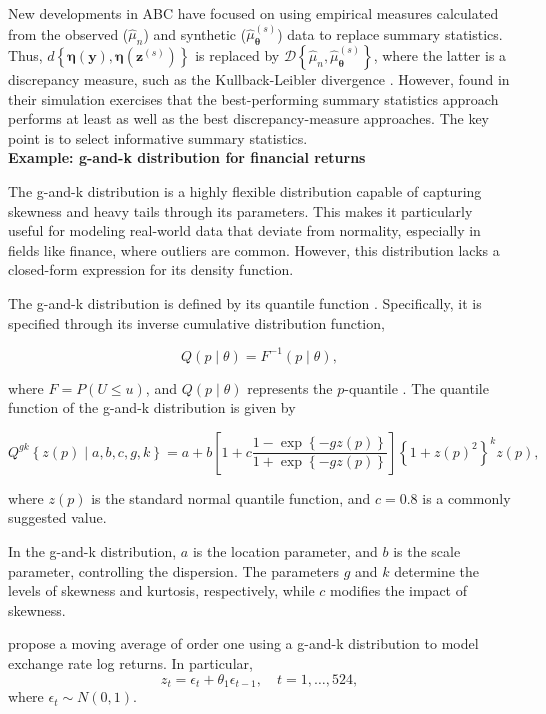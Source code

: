 New developments in ABC have focused on using empirical measures calculated from the observed ($\hat{\mu}_n$) and synthetic ($\hat{\mu}_{\boldsymbol{\theta}}^{(s)}$) data to replace summary statistics. Thus, $d\left\{ \boldsymbol\eta ({\boldsymbol y}),{\boldsymbol \eta }({\boldsymbol z}^{(s)})\right\}$ is replaced by $\mathcal{D}\left\{ \hat{\mu}_n,\hat{\mu}_{\boldsymbol{\theta}}^{(s)}\right\}$, where the latter is a discrepancy measure, such as the Kullback-Leibler divergence \cite{jiang2018approximate}. However, \cite{drovandi2022comparison} found in their simulation exercises that the best-performing summary statistics approach performs at least as well as the best discrepancy-measure approaches. The key point is to select informative summary statistics.\\

\textbf{Example: g-and-k distribution for financial returns} 

The g-and-k distribution is a highly flexible distribution capable of capturing skewness and heavy tails through its parameters. This makes it particularly useful for modeling real-world data that deviate from normality, especially in fields like finance, where outliers are common. However, this distribution lacks a closed-form expression for its density function.

The g-and-k distribution is defined by its quantile function \cite{drovandi2011likelihood}. Specifically, it is specified through its inverse cumulative distribution function,

\[
Q(p\mid{\theta}) = F^{-1}(p\mid{\theta}),
\]

where \( F = P(U \leq u) \), and \( Q (p\mid{\theta}) \) represents the \( p \)-quantile \cite{rayner2002numerical}. The quantile function of the g-and-k distribution is given by

\[
Q^{gk}\left\{z(p)\mid a, b, c, g, k\right\} = a + b\left[1 + c \frac{1 - \exp\left\{-gz(p)\right\}}{1 + \exp\left\{-gz(p)\right\}}\right] \left\{1 + z(p)^2\right\}^k z(p),
\]

where \( z(p) \) is the standard normal quantile function, and \( c = 0.8 \) is a commonly suggested value.

In the g-and-k distribution, \( a \) is the location parameter, and \( b \) is the scale parameter, controlling the dispersion. The parameters \( g \) and \( k \) determine the levels of skewness and kurtosis, respectively, while \( c \) modifies the impact of skewness.

\cite{drovandi2011likelihood} propose a moving average of order one using a g-and-k distribution to model exchange rate log returns. In particular,  
\[
z_t = \epsilon_t + \theta_1\epsilon_{t-1}, \quad t=1,\dots,524,
\]  
where \(\epsilon_t \sim N(0,1)\).  


